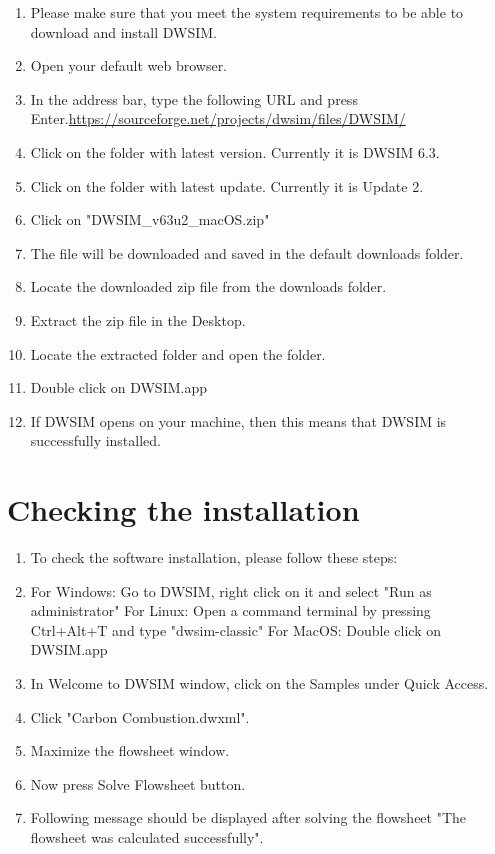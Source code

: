\documentclass[12pt,a4paper]{article}
\begin{document}
\begin{enumerate}
\item Please make sure that you meet the system requirements to be able to download and install DWSIM.
\item Open your default web browser.
\item In the address bar, type the following URL and press Enter.\newline \url{https://sourceforge.net/projects/dwsim/files/DWSIM/}

\item Click on the folder with latest version. Currently it is DWSIM 6.3.

\item Click on the folder with latest update. Currently it is Update 2.
\item Click on "DWSIM\_v63u2\_macOS.zip"
\item The file will be downloaded and saved in the default downloads folder.
\item Locate the downloaded zip file from the downloads folder.
\item Extract the zip file in the Desktop.
\item Locate the extracted folder and open the folder.
\item Double click on DWSIM.app
\item If DWSIM opens on your machine, then this means that DWSIM is successfully installed.

\end{enumerate}

\section{Checking the installation}

\begin{enumerate}

\item To check the software installation, please follow these steps:
\item For Windows: Go to DWSIM, right click on it and select "Run as administrator"
\newline For Linux: Open a command terminal by pressing Ctrl+Alt+T and type "dwsim-classic"
\newline For MacOS: Double click on DWSIM.app
\item In Welcome to DWSIM window, click on the Samples under Quick Access.
\item Click "Carbon Combustion.dwxml".
\item Maximize the flowsheet window.
\item Now press Solve Flowsheet button.
\item Following message should be displayed after solving the flowsheet "The flowsheet was calculated successfully".

\end{enumerate}
\newpage
\end{document}
